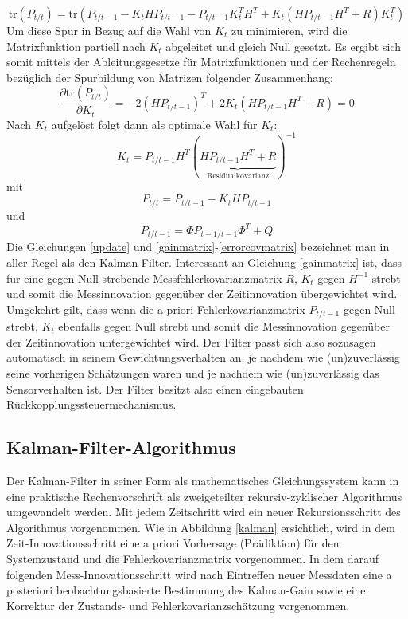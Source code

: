 \documentclass[12pt,a4paper,headsepline,bibliography=totoc,listof=totoc,headinclude=false,footinclude=false,BCOR5mm]{scrreprt} %
\begin{document}
\begin{equation}\label{josephaus} \text{tr}(P_{t/t})=\text{tr}(P_{t/t-1} - K_{t}HP_{t/t-1}  - P_{t/t-1}  K_{t}^{T}H^{T} + K_{t}(H P_{t/t-1}  H^{T} + R)K_{t}^{T})\end{equation}
Um diese Spur in Bezug auf die Wahl von $K_{t}$ zu minimieren, wird die Matrixfunktion partiell nach $K_{t}$ abgeleitet und gleich Null gesetzt. Es ergibt sich somit mittels der Ableitungsgesetze f{\"u}r Matrixfunktionen und der Rechenregeln bez{\"u}glich der Spurbildung von Matrizen folgender Zusammenhang:
\begin{equation}\label{josephaussp} \frac{\partial \text{tr}(P_{t/t})}{\partial K_{t}}=-2(HP_{t/t-1})^{T} + 2K_{t}(H P_{t/t-1}  H^{T} + R)=0\end{equation}
Nach $K_{t}$ aufgel{\"o}st folgt dann als optimale Wahl f{\"u}r $K_{t}$:
\begin{equation}\label{gainmatrix} K_{t}=P_{t/t-1}H^T(\underbrace{HP_{t/t-1}H^T + R}_{\text{Residualkovarianz}})^{-1}
\end{equation} mit 
\begin{equation}\label{errorcovmatrix2} P_{t/t}= P_{t/t-1} -K_tH P_{t/t-1}
\end{equation} und 
\begin{equation}\label{errorcovmatrix} P_{t/t-1}=\Phi P_{t-1/t-1} \Phi^T + Q
\end{equation}
Die Gleichungen \ref{update} und \ref{gainmatrix}-\ref{errorcovmatrix} bezeichnet man in aller Regel als den Kalman-Filter. Interessant an Gleichung \ref{gainmatrix} ist, dass f{\"u}r eine gegen Null strebende Messfehlerkovarianzmatrix $R$, $K_t$ gegen $H^{-1}$ strebt und somit die Messinnovation gegen{\"u}ber der Zeitinnovation {\"u}bergewichtet wird. Umgekehrt gilt, dass wenn die a priori Fehlerkovarianzmatrix $P_{t/t-1}$ gegen Null strebt, $K_t$ ebenfalls gegen Null strebt und somit die Messinnovation gegen{\"u}ber der Zeitinnovation untergewichtet wird. Der Filter passt sich also sozusagen automatisch in seinem Gewichtungsverhalten an, je nachdem wie (un)zuverl{\"a}ssig seine vorherigen Sch{\"a}tzungen waren und je nachdem wie (un)zuverl{\"a}ssig das Sensorverhalten ist. Der Filter besitzt also einen eingebauten R{\"u}ckkopplungssteuermechanismus.

\subsection{Kalman-Filter-Algorithmus}
Der Kalman-Filter in seiner Form als mathematisches Gleichungssystem kann in eine praktische Rechenvorschrift als zweigeteilter rekursiv-zyklischer Algorithmus umgewandelt werden. Mit jedem Zeitschritt wird ein neuer Rekursionsschritt  des Algorithmus vorgenommen. Wie in Abbildung \ref{kalman} ersichtlich, wird in dem Zeit-Innovationsschritt eine a priori Vorhersage (Pr{\"a}diktion) f{\"u}r den Systemzustand und die Fehlerkovarianzmatrix vorgenommen. In dem darauf folgenden Mess-Innovationsschritt wird nach Eintreffen neuer Messdaten eine a posteriori beobachtungsbasierte Bestimmung des Kalman-Gain sowie eine Korrektur der Zustands- und Fehlerkovarianzsch{\"a}tzung vorgenommen.
\end{document}
